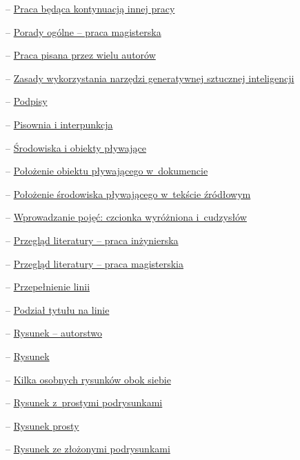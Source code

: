 \begin{description}
  \item{} -- \hyperref[sec:dod:ogolne-praca-kontynuacja]{Praca będąca kontynuacją innej pracy}
  \item{} -- \hyperref[sec:dod:ogolne-praca-magisterska]{Porady ogólne -- praca magisterska}
  \item{} -- \hyperref[sec:dod:ogolne-praca-wieluautorow]{Praca pisana przez wielu autorów}
  \item{} -- \hyperref[sec:dod:ogolne-SI]{Zasady wykorzystania narzędzi generatywnej sztucznej inteligencji}
  \item{} -- \hyperref[sec:dod:podpis]{Podpisy}
  \item{} -- \hyperref[sec:dod:pisownia-interpunkcja]{Pisownia i interpunkcja}
  \item{} -- \hyperref[sec:dod:plywajace]{Środowiska i obiekty pływające}
  \item{} -- \hyperref[sec:dod:plywajace-dokument]{Położenie obiektu pływającego w~dokumencie}
  \item{} -- \hyperref[sec:dod:plywajace-tekst]{Położenie środowiska pływającego w~tekście źródłowym}
  \item{} -- \hyperref[sec:dod:pojecia-cudzyslowy]{Wprowadzanie pojęć: czcionka wyróżniona i~cudzysłów}
  \item{} -- \hyperref[sec:dod:przeglad-literatury-inzynierska]{Przegląd literatury -- praca inżynierska}
  \item{} -- \hyperref[sec:dod:przeglad-literatury-magisterska]{Przegląd literatury -- praca magisterskia}
  \item{} -- \hyperref[sec:dod:przepelnienie]{Przepełnienie linii}
  \item{} -- \hyperref[sec:dod:tytul-podzial]{Podział tytułu na linie}
  \item{} -- \hyperref[sec:dod:rysunekautorstwo]{Rysunek -- autorstwo}
  \item{} -- \hyperref[sec:dod:rysunek]{Rysunek}
  \item{} -- \hyperref[sec:dod:rysunekobok]{Kilka osobnych rysunków obok siebie}
  \item{} -- \hyperref[sec:dod:rysunekzpodrysprosty]{Rysunek z~prostymi podrysunkami}
  \item{} -- \hyperref[sec:dod:rysunekprosty]{Rysunek prosty}
  \item{} -- \hyperref[sec:dod:rysunekzpodryszlozony]{Rysunek ze złożonymi podrysunkami}

\end{description}
